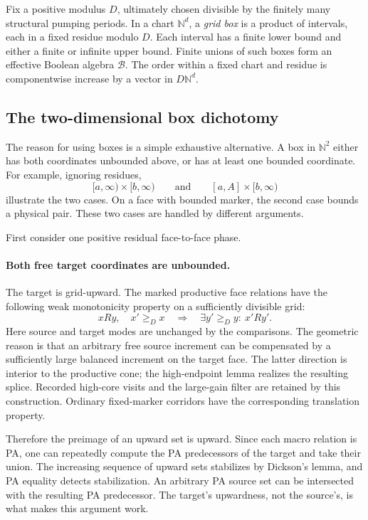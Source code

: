 \documentclass[11pt,a4paper]{article}
\theoremstyle{remark}
\newcommand{\N}{\mathbb N}
\begin{document}
Fix a positive modulus \(D\), ultimately chosen divisible by the
finitely many structural pumping periods. In a chart \(\N^d\), a
\emph{grid box} is a product of intervals, each in a fixed residue
modulo \(D\). Each interval has a finite lower bound and either a finite
or infinite upper bound. Finite unions of such boxes form an effective
Boolean algebra \(\mathcal B\). The order within a fixed chart and
residue is componentwise increase by a vector in \(D\N^d\).

\subsection{The two-dimensional box dichotomy}

The reason for using boxes is a simple exhaustive alternative. A box
in \(\N^2\) either has both coordinates unbounded above, or has at
least one bounded coordinate. For example, ignoring residues,
\[
 [a,\infty)\times[b,\infty)
 \qquad\text{and}\qquad
 [a,A]\times[b,\infty)
\]
illustrate the two cases. On a face with bounded marker, the second
case bounds a physical pair. These two cases are handled by different
arguments.

First consider one positive residual face-to-face phase.

\paragraph{Both free target coordinates are unbounded.}
The target is grid-upward. The marked productive face relations have
the following weak monotonicity property on a sufficiently divisible
grid:
\begin{equation}
 xRy,\quad x'\ge_D x
 \quad\Longrightarrow\quad
 \exists y'\ge_D y:\ x'Ry'.\label{eq:weak-monotonicity}
\end{equation}
Here source and target modes are unchanged by the comparisons.
The geometric reason is that an arbitrary free source increment can
be compensated by a sufficiently large balanced increment on the
target face. The latter direction is interior to the productive cone;
the high-endpoint lemma realizes the resulting splice. Recorded
high-core visits and the large-gain filter are retained by this
construction. Ordinary fixed-marker corridors have the corresponding
translation property.

Therefore the preimage of an upward set is upward. Since each macro
relation is PA, one can repeatedly compute the PA predecessors of the
target and take their union. The increasing sequence of upward sets
stabilizes by Dickson's lemma, and PA equality detects stabilization.
An arbitrary PA source set can be intersected with the resulting PA
predecessor. The target's upwardness, not the source's, is what makes
this argument work.
\end{document}
